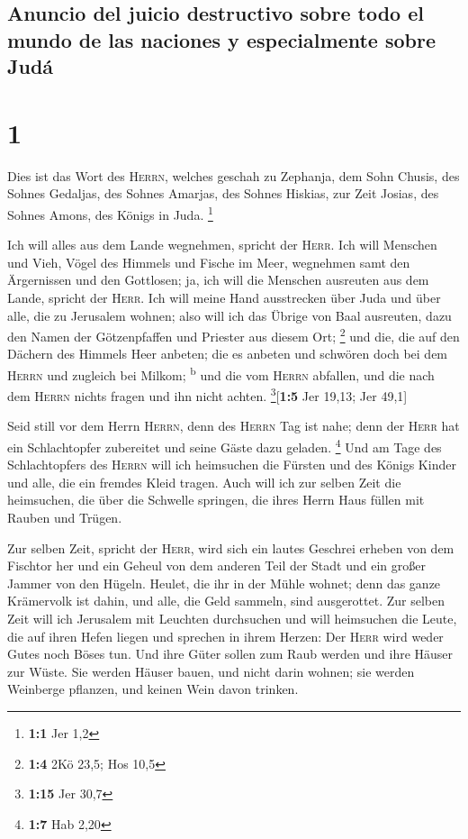 \hypertarget{anuncio-del-juicio-destructivo-sobre-todo-el-mundo-de-las-naciones-y-especialmente-sobre-juduxe1}{%
\subsection{Anuncio del juicio destructivo sobre todo el mundo de las
naciones y especialmente sobre
Judá}\label{anuncio-del-juicio-destructivo-sobre-todo-el-mundo-de-las-naciones-y-especialmente-sobre-juduxe1}}

\hypertarget{section}{%
\section{1}\label{section}}

 Dies ist das Wort des \textsc{Herrn}, welches geschah zu
Zephanja, dem Sohn Chusis, des Sohnes Gedaljas, des Sohnes Amarjas, des
Sohnes Hiskias, zur Zeit Josias, des Sohnes Amons, des Königs in Juda.
\footnote{\textbf{1:1} Jer 1,2}

 Ich will alles aus dem Lande wegnehmen, spricht der
\textsc{Herr}.  Ich will Menschen und Vieh, Vögel des
Himmels und Fische im Meer, wegnehmen samt den Ärgernissen und den
Gottlosen; ja, ich will die Menschen ausreuten aus dem Lande, spricht
der \textsc{Herr}.  Ich will meine Hand ausstrecken über
Juda und über alle, die zu Jerusalem wohnen; also will ich das Übrige
von Baal ausreuten, dazu den Namen der Götzenpfaffen und Priester aus
diesem Ort; \footnote{\textbf{1:4} 2Kö 23,5; Hos 10,5} 
und die, die auf den Dächern des Himmels Heer anbeten; die es anbeten
und schwören doch bei dem \textsc{Herrn} und zugleich bei Milkom;
\textsuperscript{b}  und die vom \textsc{Herrn} abfallen,
und die nach dem \textsc{Herrn} nichts fragen und ihn nicht achten.
\footnote{\textbf{1:15} Jer 30,7}{[}\textbf{1:5} Jer 19,13; Jer 49,1{]}

 Seid still vor dem Herrn \textsc{Herrn}, denn des
\textsc{Herrn} Tag ist nahe; denn der \textsc{Herr} hat ein
Schlachtopfer zubereitet und seine Gäste dazu geladen. \footnote{\textbf{1:7}
  Hab 2,20}  Und am Tage des Schlachtopfers des
\textsc{Herrn} will ich heimsuchen die Fürsten und des Königs Kinder und
alle, die ein fremdes Kleid tragen.  Auch will ich zur
selben Zeit die heimsuchen, die über die Schwelle springen, die ihres
Herrn Haus füllen mit Rauben und Trügen.

 Zur selben Zeit, spricht der \textsc{Herr}, wird sich
ein lautes Geschrei erheben von dem Fischtor her und ein Geheul von dem
anderen Teil der Stadt und ein großer Jammer von den Hügeln.
 Heulet, die ihr in der Mühle wohnet; denn das ganze
Krämervolk ist dahin, und alle, die Geld sammeln, sind ausgerottet.
 Zur selben Zeit will ich Jerusalem mit Leuchten
durchsuchen und will heimsuchen die Leute, die auf ihren Hefen liegen
und sprechen in ihrem Herzen: Der \textsc{Herr} wird weder Gutes noch
Böses tun.  Und ihre Güter sollen zum Raub werden und
ihre Häuser zur Wüste. Sie werden Häuser bauen, und nicht darin wohnen;
sie werden Weinberge pflanzen, und keinen Wein davon trinken.

